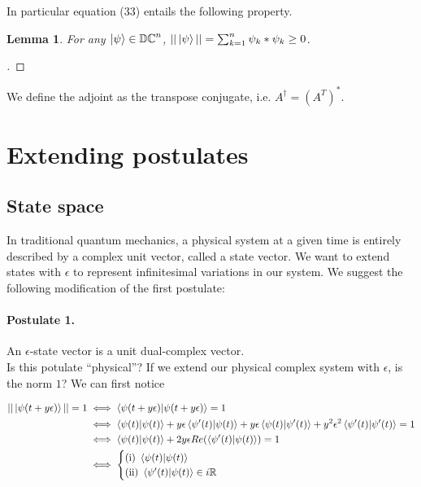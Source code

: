\documentclass{article}
\newtheorem{lemma}[theorem]{Lemma}
\newcommand{\R}{\mathbb{R}}
\newcommand{\DC}{\mathbb{DC}}
\newcommand{\e}{\epsilon}
\begin{document}
In particular equation (33) entails the following property.

\begin{lemma}
 For any $\ket{\psi} \in \DC^n$, $||\ket\psi|| = \sum_{k=1}^n \psi_k* \psi_k \geq 0$.
\end{lemma}
\begin{proof}[]
\end{proof}

We define the adjoint as the transpose conjugate, i.e. $A^\dagger = (A^T)^*$.

\section{Extending postulates}

\subsection{State space}

In traditional quantum mechanics, a physical system at a given time is entirely described by a complex unit vector, called a state vector. We want to extend states with $\e$ to represent infinitesimal variations in our system. We suggest the following modification of the first postulate:

\paragraph{Postulate 1.} An $\e$-state vector is a unit dual-complex vector.
\\

\noindent Is this potulate ``physical''? If we extend our physical complex system with $\e$, is the norm $1$? We can first notice

\begin{equation}
 \begin{split}
  || \ket{\psi(t + y \e)} || = 1 &\iff \braket{\psi(t + y \e) | \psi(t + y \e)} = 1 \\
                                 &\iff \braket{\psi(t) | \psi(t)} + y \e \braket{\psi'(t) | \psi(t)} + y \e \braket{\psi(t) | \psi'(t)} + y^2 \e^2 \braket{\psi'(t) | \psi'(t)} = 1 \\
                                 &\iff \braket{\psi(t) | \psi(t)} + 2 y \e Re(\braket{\psi'(t) | \psi(t)}) = 1\\
                                 &\iff \begin{cases}
      \text{(i) } \braket{\psi(t) | \psi(t)} \\
      \text{(ii) } \braket{\psi'(t) | \psi(t)} \in i\R
   \end{cases}
 \end{split}
\end{equation}
\end{document}
